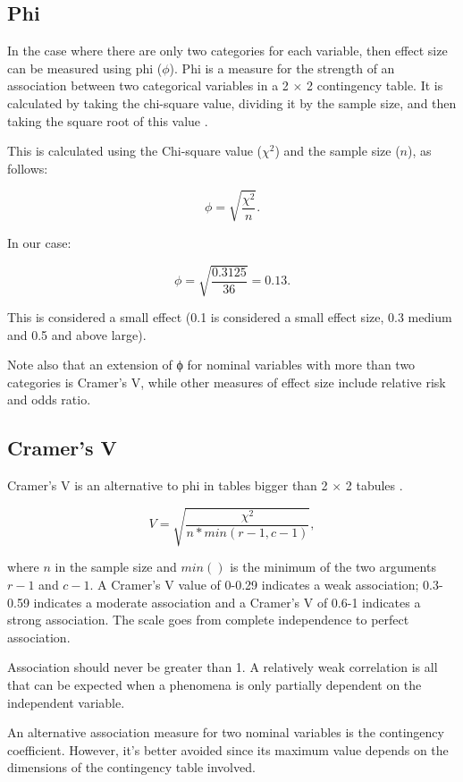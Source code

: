 \documentclass[
]{book}
\begin{document}
\hypertarget{phi}{%
\subsection{Phi}\label{phi}}

In the case where there are only two categories for each variable, then effect size can be measured using phi (\(\phi\)). Phi is a measure for the strength of an association between two categorical variables in a 2 \(\times\) 2 contingency table. It is calculated by taking the chi-square value, dividing it by the sample size, and then taking the square root of this value \citep{akoglu}.

This is calculated using the Chi-square value (\(\chi^2\)) and the sample size (\(n\)), as follows:

\[\phi=\sqrt{\frac{\chi^2}{n}}.\]

In our case:

\[\phi=\sqrt{\frac{0.3125}{36}}=0.13.\]

This is considered a small effect (0.1 is considered a small effect size, 0.3 medium and 0.5 and above large).

Note also that an extension of ϕ for nominal variables with more than two categories is Cramer's V, while other measures of effect size include relative risk and odds ratio.

\hypertarget{cramer}{%
\subsection{Cramer's V}\label{cramer}}

Cramer's V is an alternative to phi in tables bigger than 2 \(\times\) 2 tabules \citep{akoglu}.

\[V = \sqrt{\frac{\chi^2}{n*min(r-1,c-1)}},\]

where \(n\) in the sample size and \(min()\) is the minimum of the two arguments \(r-1\) and \(c-1\). A Cramer's V value of 0-0.29 indicates a weak association; 0.3-0.59 indicates a moderate association and a Cramer's V of 0.6-1 indicates a strong association. The scale goes from complete independence to perfect association.

Association should never be greater than 1. A relatively weak correlation is all that can be expected when a phenomena is only partially dependent on the independent variable.

An alternative association measure for two nominal variables is the contingency coefficient. However, it's better avoided since its maximum value depends on the dimensions of the contingency table involved.
\end{document}

